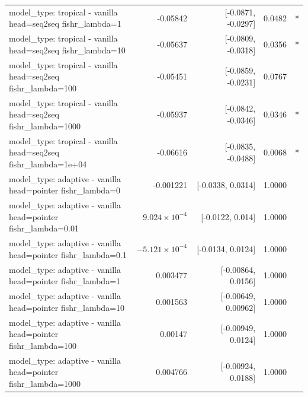 \documentclass[10pt]{article}
\makeatletter
\newcommand{\stackcell}[1]{\begin{tabular}[t]{@{}l@{}}#1\end{tabular}}
\makeatother
\begin{document}
{\begin{longtable}{lrrrl}
\stackcell{model\_type: tropical - vanilla\\\footnotesize head=seq2seq fishr\_lambda=1 } & -0.05842 & [-0.0871, -0.0297] & 0.0482 & *\\
\stackcell{model\_type: tropical - vanilla\\\footnotesize head=seq2seq fishr\_lambda=10 } & -0.05637 & [-0.0809, -0.0318] & 0.0356 & *\\
\stackcell{model\_type: tropical - vanilla\\\footnotesize head=seq2seq fishr\_lambda=100 } & -0.05451 & [-0.0859, -0.0231] & 0.0767 & \\
\stackcell{model\_type: tropical - vanilla\\\footnotesize head=seq2seq fishr\_lambda=1000 } & -0.05937 & [-0.0842, -0.0346] & 0.0346 & *\\
\stackcell{model\_type: tropical - vanilla\\\footnotesize head=seq2seq fishr\_lambda=1e+04 } & -0.06616 & [-0.0835, -0.0488] & 0.0068 & *\\
\stackcell{model\_type: adaptive - vanilla\\\footnotesize head=pointer fishr\_lambda=0 } & -0.001221 & [-0.0338, 0.0314] & 1.0000 & \\
\stackcell{model\_type: adaptive - vanilla\\\footnotesize head=pointer fishr\_lambda=0.01 } & $9.024\times10^{-4}$ & [-0.0122, 0.014] & 1.0000 & \\
\stackcell{model\_type: adaptive - vanilla\\\footnotesize head=pointer fishr\_lambda=0.1 } & $-5.121\times10^{-4}$ & [-0.0134, 0.0124] & 1.0000 & \\
\stackcell{model\_type: adaptive - vanilla\\\footnotesize head=pointer fishr\_lambda=1 } & 0.003477 & [-0.00864, 0.0156] & 1.0000 & \\
\stackcell{model\_type: adaptive - vanilla\\\footnotesize head=pointer fishr\_lambda=10 } & 0.001563 & [-0.00649, 0.00962] & 1.0000 & \\
\stackcell{model\_type: adaptive - vanilla\\\footnotesize head=pointer fishr\_lambda=100 } & 0.00147 & [-0.00949, 0.0124] & 1.0000 & \\
\stackcell{model\_type: adaptive - vanilla\\\footnotesize head=pointer fishr\_lambda=1000 } & 0.004766 & [-0.00924, 0.0188] & 1.0000 & \\

\end{longtable}}
\end{document}
